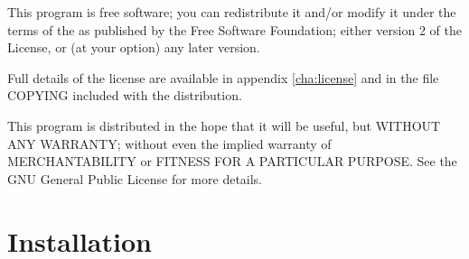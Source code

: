 This program is free software; you can redistribute it and/or modify
it under the terms of the  as published by
the Free Software Foundation; either version 2 of the License, or
(at your option) any later version. 

Full details of the license are available in appendix \ref{cha:license} and in the file \textsf{COPYING} included with the distribution. 

This program is distributed in the hope that it will be useful,
but WITHOUT ANY WARRANTY; without even the implied warranty of
MERCHANTABILITY or FITNESS FOR A PARTICULAR PURPOSE.  See the
GNU General Public License for more details.


\section{Installation}
\label{sec:installation}
